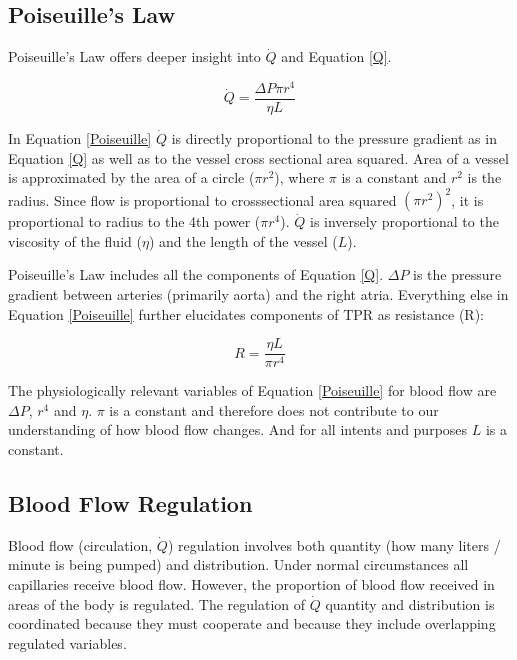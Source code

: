 \subsection{Poiseuille's Law}

Poiseuille's Law offers deeper insight into $\dot{Q}$ and Equation \ref{Q}.

\begin{equation}
    \dot{Q} = \frac{\Delta P \pi r^4}{\eta L}
    \label{Poiseuille}
\end{equation}

In Equation \ref{Poiseuille} $\dot{Q}$ is directly proportional to the pressure gradient as in Equation \ref{Q} as well as to the vessel cross sectional area squared. Area of a vessel is approximated by the area of a circle ($\pi r^2$), where $\pi$ is a constant and $r^2$ is the radius. Since flow is proportional to crosssectional area squared $(\pi r^2)^2$, it is proportional to radius to the 4th power ($\pi r^4$). $\dot{Q}$ is inversely proportional to the viscosity of the fluid ($\eta$) and the length of the vessel ($L$). 

Poiseuille's Law includes all the components of Equation \ref{Q}. $\Delta P$ is the pressure gradient between arteries (primarily aorta) and the right atria. Everything else in Equation \ref{Poiseuille} further elucidates components of TPR as resistance (R):

\begin{equation}
    R = \frac{\eta L}{\pi r^4}
    \label{resistance}
\end{equation}

The physiologically relevant variables of Equation \ref{Poiseuille} for blood flow are $\Delta P$, $r^4$ and $\eta$. $\pi$ is a constant and therefore does not contribute to our understanding of how blood flow changes. And for all intents and purposes $L$ is a constant. 

\subsection{Blood Flow Regulation}

Blood flow (circulation, $\dot{Q}$) regulation involves both quantity (how many liters / minute is being pumped) and distribution. Under normal circumstances all capillaries receive blood flow. However, the proportion of blood flow received in areas of the body is regulated. The regulation of $\dot{Q}$ quantity and distribution is coordinated because they must cooperate and because they include overlapping regulated variables. 

